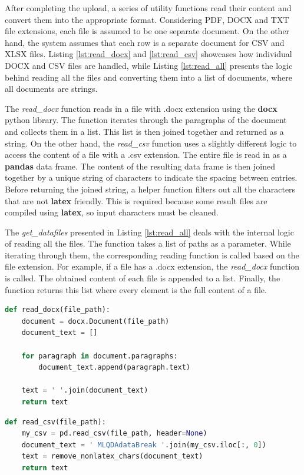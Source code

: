 \documentclass{l4proj}
\begin{document}
After completing the upload, a series of utility functions read their content and convert them into the appropriate format. Considering PDF, DOCX and TXT file extensions, each file is assumed to be one separate document. On the other hand, the system assumes that each row is a separate document for CSV and XLSX files. Listing \ref{lst:read_docx} and \ref{lst:read_csv} showcases how individual DOCX and CSV files are handled, while Listing \ref{lst:read_all} presents the logic behind reading all the files and converting them into a list of documents, where all documents are strings.

The \textit{read\_docx} function reads in a file with .docx extension using the \textbf{docx} python library. The function iterates through the paragraphs of the document and collects them in a list. This list is then joined together and returned as a string. On the other hand, the \textit{read\_csv} function uses a slightly different logic to access the content of a file with a .csv extension. The entire file is read in as a \textbf{pandas} data frame. The content of the resulting data frame is then joined together by a unique string of characters to indicate the spacing between entries. Before returning the joined string, a helper function filters out all the characters that are not \textbf{latex} friendly. This is required because some result files are compiled using \textbf{latex}, so input characters must be cleaned.

The \textit{get\_datafiles} presented in Listing \ref{lst:read_all} deals with the internal logic of reading all the files. The function takes a list of paths as a parameter. While iterating through them, the corresponding reading function is called based on the file extension. For example, if a file has a .docx extension, the \textit{read\_docx} function is called. The obtained content of each file is appended to a list. Finally, the function returns this list where every element is the full content of a file.  

\begin{lstlisting}[language=python,
caption={Function to read in a single DOCX file.},
label=lst:read_docx]
def read_docx(file_path):
    document = docx.Document(file_path)
    document_text = []

    for paragraph in document.paragraphs:
        document_text.append(paragraph.text)

    text = ' '.join(document_text)
    return text
\end{lstlisting}
\newpage
\begin{lstlisting}[language=python,
caption={Function to read in a single CSV file.},
label=lst:read_csv]
def read_csv(file_path):
    my_csv = pd.read_csv(file_path, header=None)
    document_text = ' MLQDAdataBreak '.join(my_csv.iloc[:, 0])
    text = remove_nonlatex_chars(document_text)
    return text
\end{lstlisting}
\end{document}
